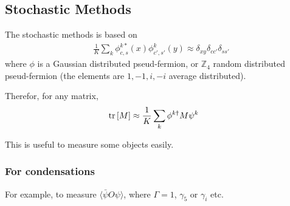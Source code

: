 \subsection{\label{StochasticMethods}Stochastic Methods}

The stochastic methods is based on
\begin{equation}
\begin{split}
&\frac{1}{K}\sum _k \phi ^{k*} _{c,s}(x)\phi ^k_{c',s'} (y) \approx \delta _{xy}\delta _{cc'}\delta _{ss'}
\end{split}
\end{equation}
where $\phi$ is a Gaussian distributed pseud-fermion, or $\mathbb{Z}_4$ random distributed pseud-fermion (the elements are $1,-1,i,-i$ average distributed).

Therefor, for any matrix,
\begin{equation}
\begin{split}
&{\rm tr} \left[ M\right] \approx \frac{1}{K}\sum _k \phi ^{k\dagger} M \psi ^k
\end{split}
\end{equation}

This is useful to measure some objects easily.

\subsubsection{\label{StochasticMethodsCondensate}For condensations}

For example, to measure $\langle \bar{\psi} O \psi \rangle$, where $\Gamma =1$, $\gamma _5$ or $\gamma _i$ etc.

